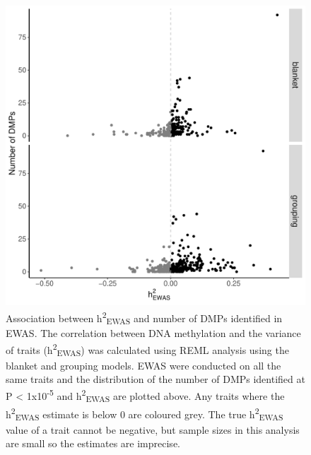 \documentclass[11pt,oneside]{bristolthesis}
\begin{document}
\begin{figure}

{\centering \includegraphics[width=1\linewidth]{figure/05-h2ewas/m2_hit_count_scatter_p5_test} 

}

\caption{Association between h\textsuperscript{2}\textsubscript{EWAS} and number of DMPs identified in EWAS. The correlation between DNA methylation and the variance of traits (h\textsuperscript{2}\textsubscript{EWAS}) was calculated using REML analysis using the blanket and grouping models. EWAS were conducted on all the same traits and the distribution of the number of DMPs identified at P \textless{} 1x10\textsuperscript{-5} and h\textsuperscript{2}\textsubscript{EWAS} are plotted above. Any traits where the h\textsuperscript{2}\textsubscript{EWAS} estimate is below 0 are coloured grey. The true h\textsuperscript{2}\textsubscript{EWAS} value of a trait cannot be negative, but sample sizes in this analysis are small so the estimates are imprecise.}\label{fig:dmps-and-h2ewas}
\end{figure}
\end{document}
